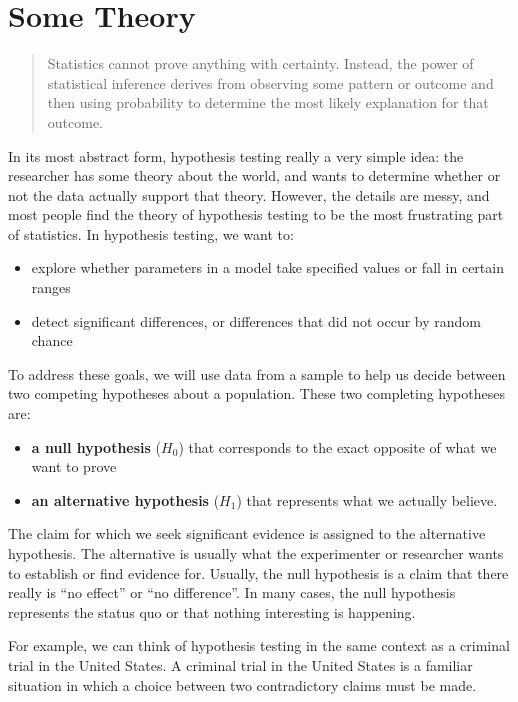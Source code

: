\documentclass[]{book}
\providecommand{\tightlist}{%
  \setlength{\itemsep}{0pt}\setlength{\parskip}{0pt}}
\begin{document}
\hypertarget{some-theory}{%
\section{Some Theory}\label{some-theory}}

\begin{quote}
Statistics cannot prove anything with certainty. Instead, the power of statistical inference derives from observing some pattern or outcome and then using probability to determine the most likely explanation for that outcome.\citep{Wheelan}
\end{quote}

In its most abstract form, hypothesis testing really a very simple idea: the researcher has some theory about the world, and wants to determine whether or not the data actually support that theory. However, the details are messy, and most people find the theory of hypothesis testing to be the most frustrating part of statistics. In hypothesis testing, we want to:

\begin{itemize}
\tightlist
\item
  explore whether parameters in a model take specified values or fall in certain ranges
\item
  detect significant differences, or differences that did not occur by random chance
\end{itemize}

To address these goals, we will use data from a sample to help us decide between two competing hypotheses about a population. These two completing hypotheses are:

\begin{itemize}
\tightlist
\item
  \textbf{a null hypothesis} (\(H_0\)) that corresponds to the exact opposite of what we want to prove
\item
  \textbf{an alternative hypothesis} (\(H_1\)) that represents what we actually believe.
\end{itemize}

The claim for which we seek significant evidence is assigned to the alternative hypothesis. The alternative is usually what the experimenter or researcher wants to establish or find evidence for. Usually, the null hypothesis is a claim that there really is ``no effect'' or ``no difference''. In many cases, the null hypothesis represents the status quo or that nothing interesting is happening.

For example, we can think of hypothesis testing in the same context as a criminal trial in the United States. A criminal trial in the United States is a familiar situation in which a choice between two contradictory claims must be made.
\end{document}
